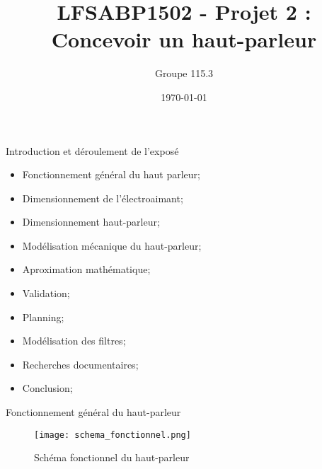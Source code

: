 \documentclass[pdf]{beamer}
\title{LFSABP1502 - Projet 2 : Concevoir un haut-parleur}
\author{Groupe 115.3}
\date{\today}
\begin{document}
\begin{frame}
\titlepage
\end{frame}

\begin{frame}{Introduction et déroulement de l'exposé}
 \begin{itemize}
		\item Fonctionnement général du haut parleur;
		\item Dimensionnement de l'électroaimant;
		\item Dimensionnement haut-parleur;
		\item Modélisation mécanique du haut-parleur;
		\item Aproximation mathématique;
		\item Validation;
		\item Planning;
		\item Modélisation des filtres;
		\item Recherches documentaires;
		\item Conclusion;
		
 \end{itemize}
\end{frame}

\begin{frame}{Fonctionnement général du haut-parleur}
\begin{figure}[ht!]
    \centering
    \texttt{[image: schema\_fonctionnel.png]}
    \caption{Schéma fonctionnel du haut-parleur}
    \label{schema_fonctionnel}
\end{figure}
\end{frame}
\end{document}
